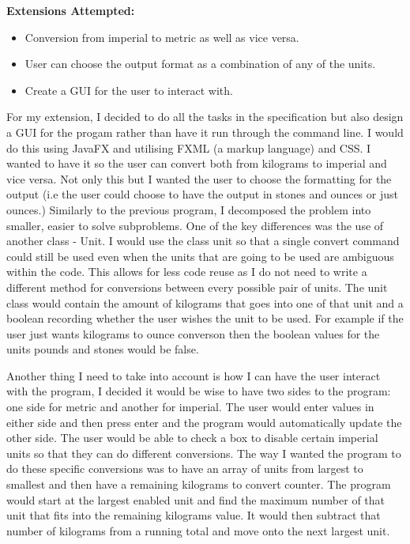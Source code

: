 \documentclass[a4paper]{article}
\begin{document}
\noindent \textbf{Extensions Attempted: }
\begin{itemize}
\item Conversion from imperial to metric as well as vice versa.
\item User can choose the output format as a combination of any of the units.
\item Create a GUI for the user to interact with.
\end{itemize}

For my extension, I decided to do all the tasks in the specification but also design a GUI for the progam rather than have it run through the command 
line. I would do this using JavaFX and utilising FXML (a markup language) and CSS. I wanted to have it so the user can convert both from kilograms to 
imperial and vice versa. Not only this but I wanted the user to choose the formatting for the output (i.e the user could choose to have the output in 
stones and ounces or just ounces.) Similarly to the previous program, I decomposed the problem into smaller, easier to solve subproblems. One of the 
key differences was the use of another class - Unit. I would use the class unit so that a single convert command could still be used even when the 
units that are going to be used are ambiguous within the code. This allows for less code reuse as I do not need to write a different method for 
conversions between every possible pair of units. The unit class would contain the amount of kilograms that goes into one of that unit and a boolean 
recording whether the user wishes the unit to be used. For example if the user just wants kilograms to ounce converson then the boolean values for the 
units pounds and stones would be false.

Another thing I need to take into account is how I can have the user interact with the program, I decided it would be wise to have two sides to the 
program: one side for metric and another for imperial. The user would enter values in either side and then press enter and the program would 
automatically update the other side. The user would be able to check a box to disable certain imperial units so that they can do different 
conversions. The way I wanted the program to do these specific conversions was to have an array of units from largest to smallest and then have a 
remaining kilograms to convert counter. The program would start at the largest enabled unit and find the maximum number of that unit that fits into 
the remaining kilograms value. It would then subtract that number of kilograms from a running total and move onto the next largest unit.
\end{document}
